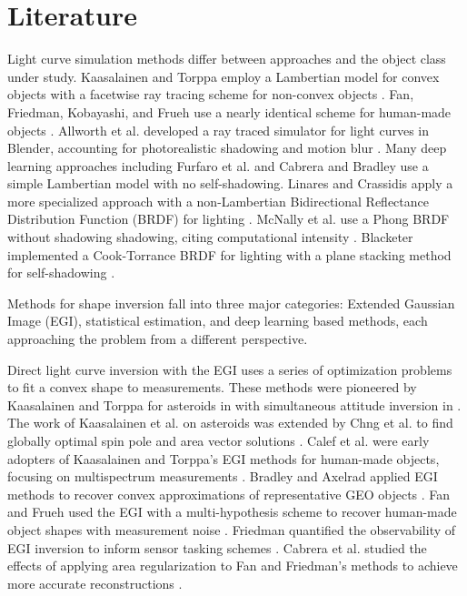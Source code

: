 \section{Literature}

Light curve simulation methods differ between approaches and the object class under study. Kaasalainen and Torppa employ a Lambertian model for convex objects with a facetwise ray tracing scheme for non-convex objects \cite{kaasalainen2001}. Fan, Friedman, Kobayashi, and Frueh use a nearly identical scheme for human-made objects \cite{fan2016, fan2020thesis,friedman2020,kobayashi2020,frueh2014}. Allworth et al. developed a ray traced simulator for light curves in Blender, accounting for photorealistic shadowing and motion blur \cite{allworth2020, allworth2021}. Many deep learning approaches including Furfaro et al. \cite{furfaro2019} and Cabrera and Bradley \cite{cabrera2021,bradley2014} use a simple Lambertian model with no self-shadowing. Linares and Crassidis apply a more specialized approach with a non-Lambertian Bidirectional Reflectance Distribution Function (BRDF) for lighting \cite{linares2018space}. McNally et al. use a Phong BRDF without shadowing shadowing, citing computational intensity \cite{mcnally2021}. Blacketer implemented a Cook-Torrance BRDF for lighting with a plane stacking method for self-shadowing \cite{blacketer2022}.

Methods for shape inversion fall into three major categories: Extended Gaussian Image (EGI), statistical estimation, and deep learning based methods, each approaching the problem from a different perspective.

Direct light curve inversion with the EGI uses a series of optimization problems to fit a convex shape to measurements. These methods were pioneered by Kaasalainen and Torppa for asteroids in \cite{kaas2001shape} with simultaneous attitude inversion in \cite{kaasalainen2001}. The work of Kaasalainen et al. on asteroids was extended by Chng et al. to find globally optimal spin pole and area vector solutions \cite{chng2022}. Calef et al. were early adopters of Kaasalainen and Torppa's EGI methods for human-made objects, focusing on multispectrum measurements \cite{calef2006photometric}. Bradley and Axelrad applied EGI methods to recover convex approximations of representative GEO objects \cite{bradley2014}. Fan and Frueh used the EGI with a multi-hypothesis scheme to recover human-made object shapes with measurement noise \cite{fan2019, fan2020thesis, fan2021}. Friedman quantified the observability of EGI inversion to inform sensor tasking schemes \cite{friedman2020, friedman2022}. Cabrera et al. studied the effects of applying area regularization to Fan and Friedman's methods to achieve more accurate reconstructions \cite{cabrera2021}.

